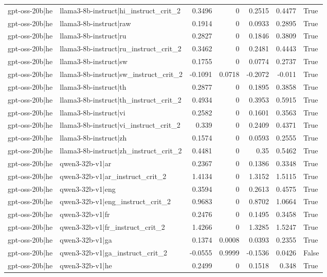 \begin{table}
\begin{tabular}{l l r r r r l}
gpt-oss-20b|he & llama3-8b-instruct|hi_instruct_crit_2 & 0.3496 & 0 & 0.2515 & 0.4477 & True \\
gpt-oss-20b|he & llama3-8b-instruct|raw & 0.1914 & 0 & 0.0933 & 0.2895 & True \\
gpt-oss-20b|he & llama3-8b-instruct|ru & 0.2827 & 0 & 0.1846 & 0.3809 & True \\
gpt-oss-20b|he & llama3-8b-instruct|ru_instruct_crit_2 & 0.3462 & 0 & 0.2481 & 0.4443 & True \\
gpt-oss-20b|he & llama3-8b-instruct|sw & 0.1755 & 0 & 0.0774 & 0.2737 & True \\
gpt-oss-20b|he & llama3-8b-instruct|sw_instruct_crit_2 & -0.1091 & 0.0718 & -0.2072 & -0.011 & True \\
gpt-oss-20b|he & llama3-8b-instruct|th & 0.2877 & 0 & 0.1895 & 0.3858 & True \\
gpt-oss-20b|he & llama3-8b-instruct|th_instruct_crit_2 & 0.4934 & 0 & 0.3953 & 0.5915 & True \\
gpt-oss-20b|he & llama3-8b-instruct|vi & 0.2582 & 0 & 0.1601 & 0.3563 & True \\
gpt-oss-20b|he & llama3-8b-instruct|vi_instruct_crit_2 & 0.339 & 0 & 0.2409 & 0.4371 & True \\
gpt-oss-20b|he & llama3-8b-instruct|zh & 0.1574 & 0 & 0.0593 & 0.2555 & True \\
gpt-oss-20b|he & llama3-8b-instruct|zh_instruct_crit_2 & 0.4481 & 0 & 0.35 & 0.5462 & True \\
gpt-oss-20b|he & qwen3-32b-v1|ar & 0.2367 & 0 & 0.1386 & 0.3348 & True \\
gpt-oss-20b|he & qwen3-32b-v1|ar_instruct_crit_2 & 1.4134 & 0 & 1.3152 & 1.5115 & True \\
gpt-oss-20b|he & qwen3-32b-v1|eng & 0.3594 & 0 & 0.2613 & 0.4575 & True \\
gpt-oss-20b|he & qwen3-32b-v1|eng_instruct_crit_2 & 0.9683 & 0 & 0.8702 & 1.0664 & True \\
gpt-oss-20b|he & qwen3-32b-v1|fr & 0.2476 & 0 & 0.1495 & 0.3458 & True \\
gpt-oss-20b|he & qwen3-32b-v1|fr_instruct_crit_2 & 1.4266 & 0 & 1.3285 & 1.5247 & True \\
gpt-oss-20b|he & qwen3-32b-v1|ga & 0.1374 & 0.0008 & 0.0393 & 0.2355 & True \\
gpt-oss-20b|he & qwen3-32b-v1|ga_instruct_crit_2 & -0.0555 & 0.9999 & -0.1536 & 0.0426 & False \\
gpt-oss-20b|he & qwen3-32b-v1|he & 0.2499 & 0 & 0.1518 & 0.348 & True \\

\end{tabular}
\end{table}
